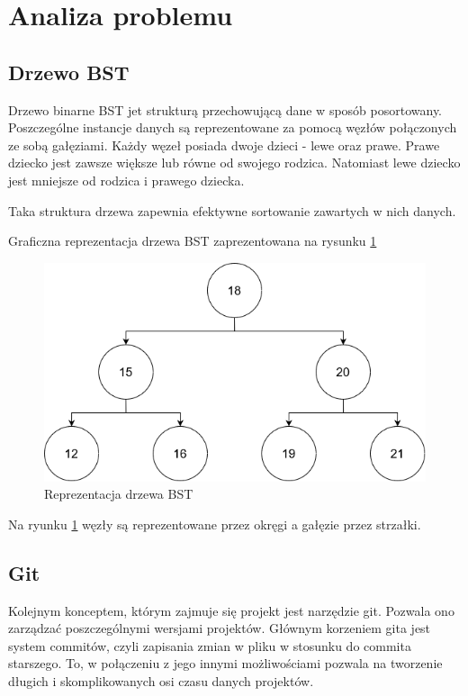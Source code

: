 \newpage
\section{Analiza problemu}		%

\subsection{Drzewo BST}

Drzewo binarne BST\cite{bstwiki} jet strukturą przechowującą dane w sposób posortowany. Poszczególne instancje danych są reprezentowane za pomocą węzłów połączonych ze sobą gałęziami. Każdy węzeł posiada dwoje dzieci - lewe oraz prawe. Prawe dziecko jest zawsze większe lub równe od swojego rodzica. Natomiast lewe dziecko jest mniejsze od rodzica i prawego dziecka.

Taka struktura drzewa zapewnia efektywne sortowanie zawartych w nich danych.

Graficzna reprezentacja drzewa BST zaprezentowana na rysunku \ref{fig:treegraphic}

\begin{figure}[H]
	\centering
	\includegraphics[width=0.7\linewidth]{images/DiagramBTS}
	\caption{Reprezentacja drzewa BST}
	\label{fig:treegraphic}
\end{figure}

Na ryunku \ref{fig:treegraphic} węzły są reprezentowane przez okręgi a gałęzie przez strzałki.


\subsection{Git}
Kolejnym konceptem, którym zajmuje się projekt jest narzędzie git\cite{gitsite}. Pozwala ono zarządzać poszczególnymi wersjami projektów. Głównym korzeniem gita jest system commitów, czyli zapisania zmian w pliku w stosunku do commita starszego. To, w połączeniu z jego innymi możliwościami pozwala na tworzenie długich i skomplikowanych osi czasu danych projektów. 

